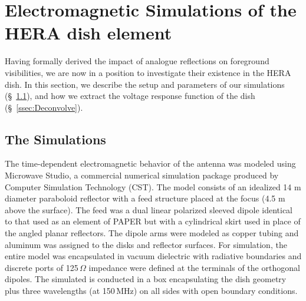 \documentclass[twocolumn]{emulateapj}
\begin{document}
\section{Electromagnetic Simulations of the HERA dish element}\label{sec:Simulations}
 

Having formally derived the impact of analogue reflections on foreground visibilities, we are now in a position to investigate their existence in the HERA dish. In this section, we describe the setup and parameters of our simulations (\S~\ref{ssec:Simulations}), and how we extract the voltage response function of the dish (\S~\ref{ssec:Deconvolve}).





\subsection{The Simulations}\label{ssec:Simulations}
 The time-dependent electromagnetic behavior of the antenna was modeled using Microwave Studio, a commercial numerical simulation package produced by Computer Simulation Technology (CST).  The model consists of an idealized 14 m diameter paraboloid reflector with a feed structure placed at the focus (4.5 m above the surface). The feed was a dual linear polarized sleeved dipole identical to that used as an element of PAPER but with a cylindrical skirt used in place of the angled planar reflectors.   The dipole arms were modeled as copper tubing and aluminum was assigned to the disks and reflector surfaces.  For simulation, the entire model was encapsulated in vacuum dielectric with radiative boundaries and discrete ports of 125\,$\Omega$ impedance were defined at the terminals of the orthogonal dipoles. The simulated is conducted in a box encapsulating the dish geometry plus three wavelengths (at 150\,MHz) on all sides with open boundary conditions. 
\end{document}
